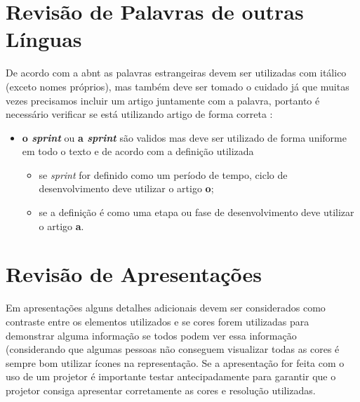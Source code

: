 \section{Revisão de Palavras de outras Línguas}
\label{revisao-palavras-estrangeiras}

De acordo com a \ac{abnt} as palavras estrangeiras devem ser utilizadas com itálico (exceto nomes próprios), mas também deve ser tomado o cuidado já que muitas vezes precisamos incluir um artigo juntamente com a palavra, portanto é necessário verificar  se está utilizando artigo de forma correta :

\begin{itemize}
    \item \textbf{o \emph{sprint}} ou \textbf{a \emph{sprint}} são validos mas deve ser utilizado de forma uniforme em todo o texto e de acordo com a definição utilizada 
    \begin{itemize}
        \item se \emph{sprint} for definido como um período de tempo, ciclo de desenvolvimento deve utilizar o artigo \textbf{o};
        
        \item se a definição é como uma etapa ou fase de desenvolvimento deve utilizar o artigo \textbf{a}.
    \end{itemize}
    
\end{itemize}


\section{Revisão de Apresentações}
\label{revisao-apresentacoes}

Em apresentações alguns detalhes adicionais devem ser considerados como contraste entre os elementos utilizados e se cores forem utilizadas para demonstrar alguma informação se todos podem ver essa informação (considerando que algumas pessoas não conseguem visualizar todas as cores é sempre bom utilizar ícones na representação. Se a apresentação for feita com o uso de um projetor é importante testar antecipadamente para garantir que o projetor consiga apresentar corretamente as cores e resolução utilizadas.



